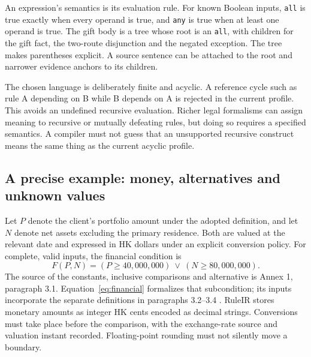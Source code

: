 An expression's semantics is its evaluation rule. For known Boolean inputs,
\texttt{all} is true exactly when every operand is true, and \texttt{any} is true
when at least one operand is true. The gift body is a tree whose root is an
\texttt{all}, with children for the gift fact, the two-route disjunction and
the negated exception. The tree makes parentheses explicit. A source sentence
can be attached to the root and narrower evidence anchors to its children.

The chosen language is deliberately finite and acyclic. A reference cycle such
as rule A depending on B while B depends on A is rejected in the current
profile. This avoids an undefined recursive evaluation. Richer legal formalisms
can assign meaning to recursive or mutually defeating rules, but doing so
requires a specified semantics. A compiler must not guess that an unsupported
recursive construct means the same thing as the current acyclic profile.

\subsection{A precise example: money, alternatives and unknown values}
\label{merge:P-03-product:03}

\label{sec:semantics}

Let $P$ denote the client's portfolio amount under the adopted definition, and
let $N$ denote net assets excluding the primary residence. Both are valued at the
relevant date and expressed in HK dollars under an explicit conversion policy.
For complete, valid inputs, the financial condition is
\begin{equation}
 F(P,N)=(P\geq 40{,}000{,}000)\ \lor\ (N\geq 80{,}000{,}000).
 \label{eq:financial}
\end{equation}
The source of the constants, inclusive comparisons and alternative is Annex 1,
paragraph 3.1. Equation~\eqref{eq:financial} formalizes that subcondition; its
inputs incorporate the separate definitions in paragraphs 3.2--3.4
\citep{sfcspiannex1}. RuleIR stores monetary amounts as
integer HK cents encoded as decimal strings. Conversions must take place
before the comparison, with the exchange-rate source and valuation instant
recorded. Floating-point rounding must not silently move a boundary.

